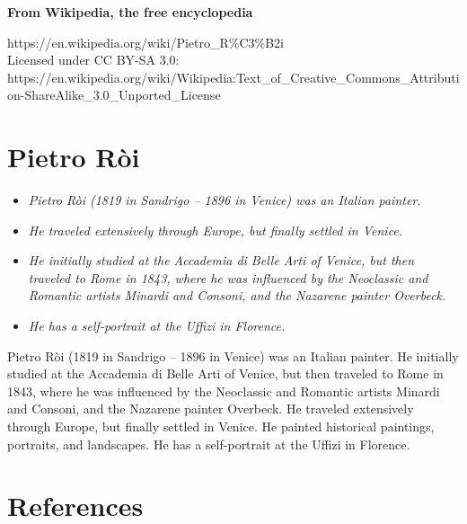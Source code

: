 \textbf{From Wikipedia, the free encyclopedia}

https://en.wikipedia.org/wiki/Pietro\_R\%C3\%B2i\\
Licensed under CC BY-SA 3.0:\\
https://en.wikipedia.org/wiki/Wikipedia:Text\_of\_Creative\_Commons\_Attribution-ShareAlike\_3.0\_Unported\_License

\section{Pietro Ròi}\label{pietro-ruxf2i}

\begin{itemize}
\item
  \emph{Pietro Ròi (1819 in Sandrigo -- 1896 in Venice) was an Italian
  painter.}
\item
  \emph{He traveled extensively through Europe, but finally settled in
  Venice.}
\item
  \emph{He initially studied at the Accademia di Belle Arti of Venice,
  but then traveled to Rome in 1843, where he was influenced by the
  Neoclassic and Romantic artists Minardi and Consoni, and the Nazarene
  painter Overbeck.}
\item
  \emph{He has a self-portrait at the Uffizi in Florence.}
\end{itemize}

Pietro Ròi (1819 in Sandrigo -- 1896 in Venice) was an Italian painter.
He initially studied at the Accademia di Belle Arti of Venice, but then
traveled to Rome in 1843, where he was influenced by the Neoclassic and
Romantic artists Minardi and Consoni, and the Nazarene painter Overbeck.
He traveled extensively through Europe, but finally settled in Venice.
He painted historical paintings, portraits, and landscapes. He has a
self-portrait at the Uffizi in Florence.

\section{References}\label{references}

